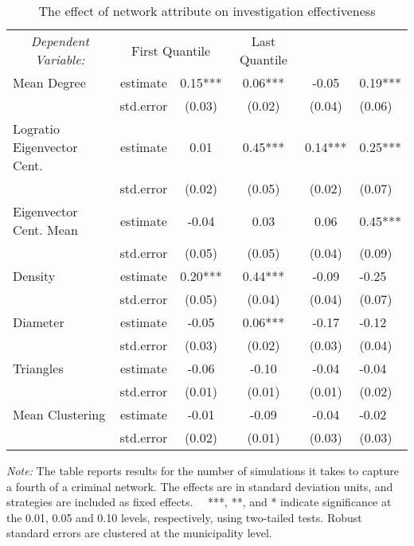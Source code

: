 \begin{table}[H]

\caption{\label{tab:table1}The effect of network attribute on investigation effectiveness}
\centering
\begin{threeparttable}
\begin{tabular}[t]{lccccl}
\toprule
\multicolumn{1}{c}{\textit{Dependent Variable:}} & \multicolumn{2}{c}{First Quantile} & \multicolumn{1}{c}{Last Quantile} \\
\cmidrule(l{3pt}r{3pt}){1-1} \cmidrule(l{3pt}r{3pt}){2-3} \cmidrule(l{3pt}r{3pt}){4-4}
Mean Degree & estimate & 0.15*** & 0.06*** & -0.05 & 0.19***\\
 & std.error & (0.03) & (0.02) & (0.04) & (0.06)\\
Logratio Eigenvector Cent. & estimate & 0.01 & 0.45*** & 0.14*** & 0.25***\\
\addlinespace
 & std.error & (0.02) & (0.05) & (0.02) & (0.07)\\
Eigenvector Cent. Mean & estimate & -0.04 & 0.03 & 0.06 & 0.45***\\
 & std.error & (0.05) & (0.05) & (0.04) & (0.09)\\
\addlinespace
Density & estimate & 0.20*** & 0.44*** & -0.09 & -0.25\\
 & std.error & (0.05) & (0.04) & (0.04) & (0.07)\\
Diameter & estimate & -0.05 & 0.06*** & -0.17 & -0.12\\
\addlinespace
 & std.error & (0.03) & (0.02) & (0.03) & (0.04)\\
Triangles & estimate & -0.06 & -0.10 & -0.04 & -0.04\\
 & std.error & (0.01) & (0.01) & (0.01) & (0.02)\\
\addlinespace
Mean Clustering & estimate & -0.01 & -0.09 & -0.04 & -0.02\\
 & std.error & (0.02) & (0.01) & (0.03) & (0.03)\\
\bottomrule
\end{tabular}
\begin{tablenotes}[para]
\item \footnotesize \textit{Note:} The table reports results for the number of simulations it 
      takes to capture a fourth of a criminal network. The effects are in standard deviation units, 
      and strategies are included as fixed effects. \ \
      ***, **, and *
      indicate significance at the 0.01, 0.05 and 0.10 levels, respectively, using two-tailed tests. Robust standard errors are clustered
      at the municipality level.
\end{tablenotes}
\end{threeparttable}
\end{table}
